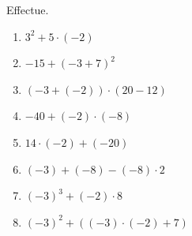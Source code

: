 %
%
    Effectue.
    \begin{enumerate}[cols=2, itemsep=1emm]
        \item \(3^{2} + 5 \cdot ( - 2) \)
        \item \(- 15 + ( - 3 + 7)^{2} \)
        \item \(\left( - 3 + ( - 2) \right) \cdot (20 - 12) \)
        \item \(- 40 + ( - 2) \cdot ( - 8) \)
        \item \(14 \cdot ( - 2) + ( - 20) \)
        \item \(( - 3) + ( - 8) - ( - 8) \cdot 2 \)
        \item \(( - 3)^{3} + ( - 2) \cdot 8 \)
        \item \(( - 3)^{2} + \left( ( - 3) \cdot ( - 2) + 7 \right) \)
    \end{enumerate}
